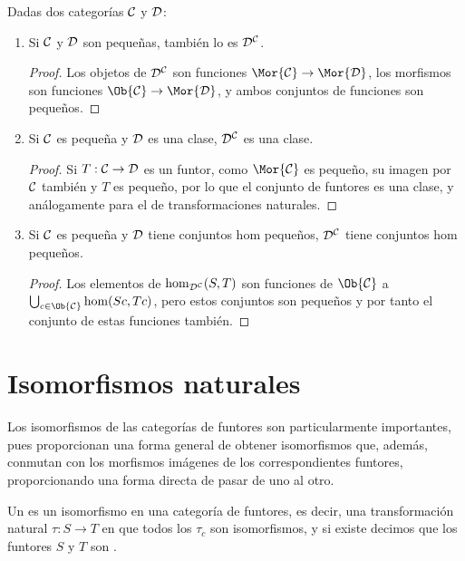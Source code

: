 \begin{proposition}
  Dadas dos categorías $\mathcal{C}$ y $\mathcal{D}$:
  \begin{enumerate}
  \item Si $\mathcal{C}$ y $\mathcal{D}$ son pequeñas, también lo es $\mathcal{D}^{\mathcal{C}}$.
    \begin{proof}
      Los objetos de $\mathcal{D}^{\mathcal{C}}$ son funciones $\Mor{\cC}\to\Mor{\cD}$, los
      morfismos son funciones $\Ob{\cC}\to\Mor{\cD}$, y ambos conjuntos de
      funciones son pequeños.
    \end{proof}
  \item Si $\mathcal{C}$ es pequeña y $\mathcal{D}$ es una clase, $\mathcal{D}^{\mathcal{C}}$ es una clase.
    \begin{proof}
      Si $T:\mathcal{C}\to\mathcal{D}$ es un funtor, como $\Mor{\cC}$ es pequeño, su imagen por
      $\mathcal{C}$ también y $T$ es pequeño, por lo que el conjunto de funtores es una
      clase, y análogamente para el de transformaciones naturales.
    \end{proof}
  \item Si $\mathcal{C}$ es pequeña y $\mathcal{D}$ tiene conjuntos hom pequeños, $\mathcal{D}^{\mathcal{C}}$
    tiene conjuntos hom pequeños.
    \begin{proof}
      Los elementos de $\hom_{\mathcal{D}^{\mathcal{C}}}(S,T)$ son funciones de $\Ob{\cC}$ a
      $\bigcup_{c\in\Ob{\cC}}\hom(Sc,Tc)$, pero estos conjuntos son pequeños y
      por tanto el conjunto de estas funciones también.
    \end{proof}
  \end{enumerate}
\end{proposition}

\section{Isomorfismos naturales}

Los isomorfismos de las categorías de funtores son particularmente importantes,
pues proporcionan una forma general de obtener isomorfismos que, además,
conmutan con los morfismos imágenes de los correspondientes funtores,
proporcionando una forma directa de pasar de uno al otro.

\begin{definition}
  Un  es un isomorfismo en una categoría de funtores,
  es decir, una transformación natural $\tau:S\to T$ en que todos los $\tau_c$
  son isomorfismos, y si existe decimos que los funtores $S$ y $T$ son
  .
\end{definition}

